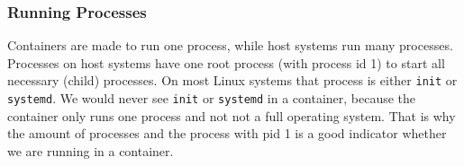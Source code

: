 \subsubsection{Running Processes}\label{subsubsection:processes}
Containers are made to run one process, while host systems run many processes. Processes on host systems have one root process (with process id 1) to start all necessary (child) processes. On most Linux systems that process is either \lstinline{init} or \lstinline{systemd}. We would never see \lstinline{init} or \lstinline{systemd} in a container, because the container only runs one process and not not a full operating system. That is why the amount of processes and the process with pid 1 is a good indicator whether we are running in a container.
